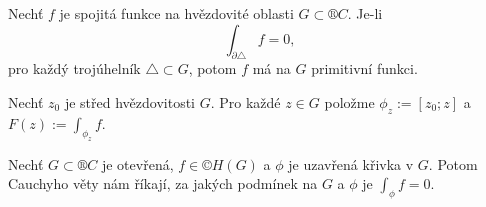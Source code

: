 \documentclass[12pt]{article}					%
\begin{document}
\begin{tvrzeni}[Dodatek]
	Nechť $f$ je spojitá funkce na hvězdovité oblasti $G \subset ®C$. Je-li
	$$ \int_{\partial \triangle} f = 0, $$
	pro každý trojúhelník $\triangle \subset G$, potom $f$ má na $G$ primitivní funkci.

	\begin{dukazin}
		Nechť $z_0$ je střed hvězdovitosti $G$. Pro každé $z \in G$ položme $\phi_z := [z_0; z]$ a $F(z) := \int_{\phi_z} f$.
	\end{dukazin}
\end{tvrzeni}

\begin{poznamka}
	Nechť $G \subset ®C$ je otevřená, $f \in ©H(G)$ a $\phi$ je uzavřená křivka v $G$. Potom Cauchyho věty nám říkají, za jakých podmínek na $G$ a $\phi$ je $\int_\phi f = 0$.
\end{poznamka}
\end{document}
